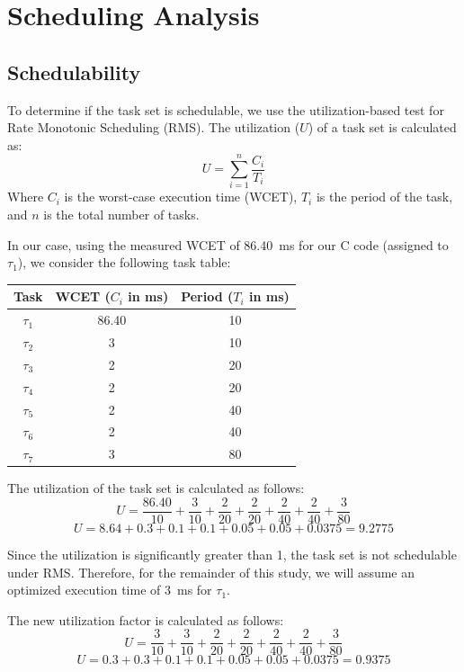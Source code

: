 \documentclass{report}
\begin{document}
\section{Scheduling Analysis}
\subsection{Schedulability}
To determine if the task set is schedulable, we use the utilization-based test for Rate Monotonic Scheduling (RMS). The utilization ($U$) of a task set is calculated as:
\[U = \sum_{i=1}^{n}\frac{C_i}{T_i} \]
Where $C_i$ is the worst-case execution time (WCET), $T_i$ is the period of the task, and $n$ is the total number of tasks.

In our case, using the measured WCET of 86.40~ms for our C code (assigned to $\tau_1$), we consider the following task table:

\begin{center}
\renewcommand{\arraystretch}{1.2}
\begin{tabular}{ccc}
\toprule
\textbf{Task} & \textbf{WCET ($C_i$ in ms)} & \textbf{Period ($T_i$ in ms)} \\
\midrule
$\tau_1$ & 86.40 & 10  \\
$\tau_2$ & 3     & 10  \\
$\tau_3$ & 2     & 20  \\
$\tau_4$ & 2     & 20  \\
$\tau_5$ & 2     & 40  \\
$\tau_6$ & 2     & 40  \\
$\tau_7$ & 3     & 80  \\
\bottomrule
\end{tabular}
\end{center}

The utilization of the task set is calculated as follows:
\[U = \frac{86.40}{10} + \frac{3}{10} + \frac{2}{20} + \frac{2}{20} + \frac{2}{40} + \frac{2}{40} + \frac{3}{80}\]
\[U = 8.64 + 0.3 + 0.1 + 0.1 + 0.05 + 0.05 + 0.0375 = 9.2775\]

Since the utilization is significantly greater than 1, the task set is not schedulable under RMS. 
Therefore, for the remainder of this study, we will assume an optimized execution time of 3~ms for $\tau_1$. 

The new utilization factor is calculated as follows:
\[U = \frac{3}{10} + \frac{3}{10} + \frac{2}{20} + \frac{2}{20} + \frac{2}{40} + \frac{2}{40} + \frac{3}{80}\]
\[U = 0.3 + 0.3 + 0.1 + 0.1 + 0.05 + 0.05 + 0.0375 = 0.9375\]
\end{document}
